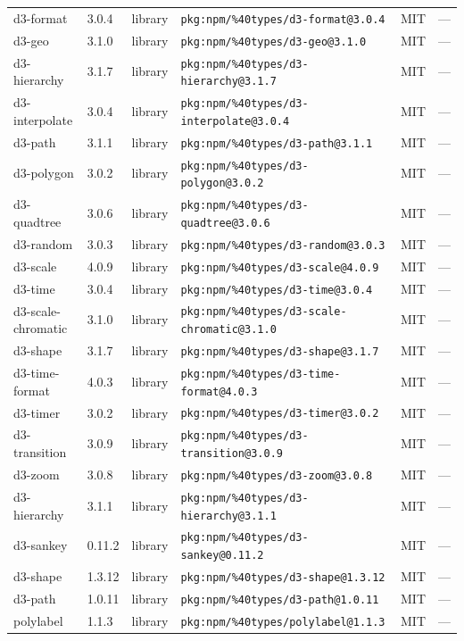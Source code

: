\documentclass[11pt]{article}
\begin{document}
\begin{longtable}{|l|l|l|p{2.2cm}|l|p{4cm}|}
d3-format & 3.0.4 & library & \texttt{pkg:npm/\%40types/d3-format@3.0.4} & MIT & — \\
d3-geo & 3.1.0 & library & \texttt{pkg:npm/\%40types/d3-geo@3.1.0} & MIT & — \\
d3-hierarchy & 3.1.7 & library & \texttt{pkg:npm/\%40types/d3-hierarchy@3.1.7} & MIT & — \\
d3-interpolate & 3.0.4 & library & \texttt{pkg:npm/\%40types/d3-interpolate@3.0.4} & MIT & — \\
d3-path & 3.1.1 & library & \texttt{pkg:npm/\%40types/d3-path@3.1.1} & MIT & — \\
d3-polygon & 3.0.2 & library & \texttt{pkg:npm/\%40types/d3-polygon@3.0.2} & MIT & — \\
d3-quadtree & 3.0.6 & library & \texttt{pkg:npm/\%40types/d3-quadtree@3.0.6} & MIT & — \\
d3-random & 3.0.3 & library & \texttt{pkg:npm/\%40types/d3-random@3.0.3} & MIT & — \\
d3-scale & 4.0.9 & library & \texttt{pkg:npm/\%40types/d3-scale@4.0.9} & MIT & — \\
d3-time & 3.0.4 & library & \texttt{pkg:npm/\%40types/d3-time@3.0.4} & MIT & — \\
d3-scale-chromatic & 3.1.0 & library & \texttt{pkg:npm/\%40types/d3-scale-chromatic@3.1.0} & MIT & — \\
d3-shape & 3.1.7 & library & \texttt{pkg:npm/\%40types/d3-shape@3.1.7} & MIT & — \\
d3-time-format & 4.0.3 & library & \texttt{pkg:npm/\%40types/d3-time-format@4.0.3} & MIT & — \\
d3-timer & 3.0.2 & library & \texttt{pkg:npm/\%40types/d3-timer@3.0.2} & MIT & — \\
d3-transition & 3.0.9 & library & \texttt{pkg:npm/\%40types/d3-transition@3.0.9} & MIT & — \\
d3-zoom & 3.0.8 & library & \texttt{pkg:npm/\%40types/d3-zoom@3.0.8} & MIT & — \\
d3-hierarchy & 3.1.1 & library & \texttt{pkg:npm/\%40types/d3-hierarchy@3.1.1} & MIT & — \\
d3-sankey & 0.11.2 & library & \texttt{pkg:npm/\%40types/d3-sankey@0.11.2} & MIT & — \\
d3-shape & 1.3.12 & library & \texttt{pkg:npm/\%40types/d3-shape@1.3.12} & MIT & — \\
d3-path & 1.0.11 & library & \texttt{pkg:npm/\%40types/d3-path@1.0.11} & MIT & — \\
polylabel & 1.1.3 & library & \texttt{pkg:npm/\%40types/polylabel@1.1.3} & MIT & — \\

\end{longtable}
\end{document}
